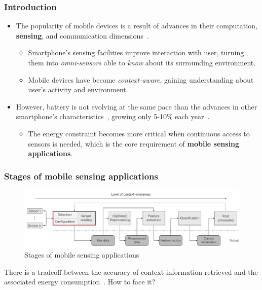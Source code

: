 \documentclass[compress,9pt,xcolor={dvipsnames,table}]{beamer}
\begin{document}
\begin{frame}[t]\frametitle{Introduction}
\begin{itemize}
  \item The popularity of mobile devices is a result of advances in their computation, \textbf{sensing}, and communication dimensions~\cite{Islam2014}.
  \begin{itemize}
    \item Smartphone's sensing facilities improve interaction with user, turning them into \emph{omni-sensors} able to \emph{know} about its surrounding environment.
    \item Mobile devices have become \emph{context-aware}, gaining understanding about user's activity and environment.
  \end{itemize}
  
  \item However, battery is not evolving at the same pace than the advances in other smartphone's characteristics~\cite{Kjaergaard2012}, growing only 5-10\% each year~\cite{Ma2012,Evarts2015}.
  \begin{itemize}
    \item The energy constraint becomes more critical when continuous access to sensors is needed, which is the core requirement of \textbf{mobile sensing applications}. 
  \end{itemize}
\end{itemize}
\end{frame}

\begin{frame}[t]\frametitle{Stages of mobile sensing applications}
\begin{figure}[tb]
  \centering
  \includegraphics[width=\textwidth]{../../../resources/images/vectors/msa-stages}
  \caption{Stages of mobile sensing applications}
  \label{fig:msa-stages}
\end{figure}
There is a tradeoff between the accuracy of context information retrieved and the associated energy consumption~\cite{Sim2014,Rachuri2012}.
How to face it?
\end{frame}
\end{document}

